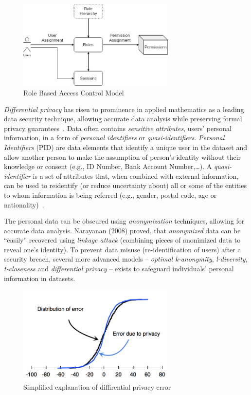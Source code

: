 \begin{figure}[htb]
    \centering
    \includegraphics[width=0.7\textwidth]{figures/rbacm.png}
    \caption{Role Based Access Control Model}
    \label{fig:rbacm}
\end{figure}
\FloatBarrier

\textit{Differential privacy} has risen to prominence in applied mathematics as a leading data security technique, allowing accurate data analysis while preserving formal privacy guarantees~\cite{cummings2018}.
Data often contains \textit{sensitive attributes}, users' personal information, in a form of \textit{personal identifiers} or \textit{quasi-identifiers}.
\textit{Personal Identifiers} (PID) are data elements that identify a unique user in the dataset and allow another person to make the assumption of person's identity without their knowledge or consent (e.g., ID Number, Bank Account Number,\ldots).
A \textit{quasi-identifier} is a set of attributes that, when combined with external information, can be used to reidentify (or reduce uncertainty about) all or some of the entities to whom information is being referred (e.g., gender, postal code, age or nationality)~\cite{qid-springer}.

The personal data can be obscured using \textit{anonymization} techniques, allowing for accurate data analysis.
Narayanan (2008) proved, that \textit{anonymized} data can be \enquote{easily} recovered using \textit{linkage attack} (combining pieces of anonimized data to reveal one's identity).
To prevent data misuse (re-identification of users) after a security breach, several more advanced models – \textit{optimal k-anonymity}, \textit{l-diversity}, \textit{t-closeness} and \textit{differential privacy} – exists to safeguard individuals' personal information in datasets.

\begin{figure}[htb]
    \centering
    \includegraphics[width=0.7\textwidth]{figures/cdf3.png}
    \caption{Simplified explanation of diffirential privacy error~\cite{difpriv2016}}
    \label{fig:cdf3}
\end{figure}
\FloatBarrier

